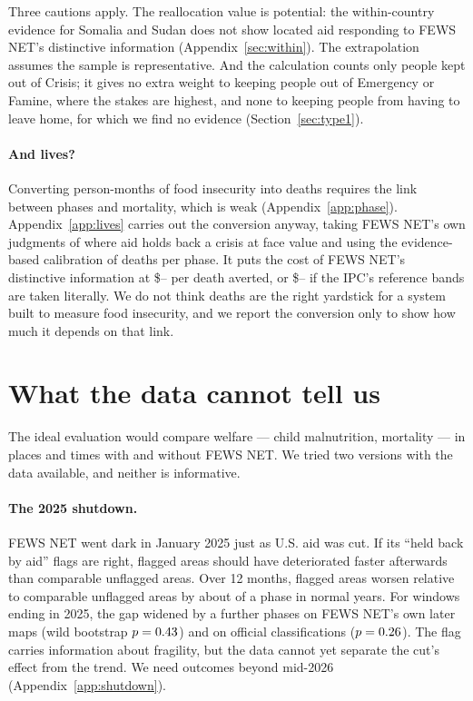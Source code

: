 \documentclass[11pt]{article}
\begin{document}
Three cautions apply. The reallocation value is potential: the within-country evidence for Somalia and Sudan does not show located aid responding to FEWS NET's distinctive information (Appendix~\ref{sec:within}). The extrapolation assumes the sample is representative. And the calculation counts only people kept out of Crisis; it gives no extra weight to keeping people out of Emergency or Famine, where the stakes are highest, and none to keeping people from having to leave home, for which we find no evidence (Section~\ref{sec:type1}).

\paragraph{And lives?} Converting person-months of food insecurity into deaths requires the link between phases and mortality, which is weak (Appendix~\ref{app:phase}). Appendix~\ref{app:lives} carries out the conversion anyway, taking FEWS NET's own judgments of where aid holds back a crisis at face value and using the evidence-based calibration of deaths per phase. It puts the cost of FEWS NET's distinctive information at \$\bcDistinctLo{}--\bcDistinctHi{} per death averted, or \$\ipcDistinctLo{}--\ipcDistinctHi{} if the IPC's reference bands are taken literally. We do not think deaths are the right yardstick for a system built to measure food insecurity, and we report the conversion only to show how much it depends on that link.

\FloatBarrier
\section{What the data cannot tell us}\label{sec:limits}\label{sec:limits2}

The ideal evaluation would compare welfare --- child malnutrition, mortality --- in places and times with and without FEWS NET. We tried two versions with the data available, and neither is informative.

\paragraph{The 2025 shutdown.} FEWS NET went dark in January 2025 just as U.S. aid was cut. If its ``held back by aid'' flags are right, flagged areas should have deteriorated faster afterwards than comparable unflagged areas. Over 12 months, flagged areas worsen relative to comparable unflagged areas by about \flagOwnPlacebo{} of a phase in normal years. For windows ending in 2025, the gap widened by a further \flagOwn{} phases on FEWS NET's own later maps (wild bootstrap $p = 0.43{}$) and \flagIpc{} on official classifications ($p = 0.26{}$). The flag carries information about fragility, but the data cannot yet separate the cut's effect from the trend. We need outcomes beyond mid-2026 (Appendix~\ref{app:shutdown}).
\end{document}

